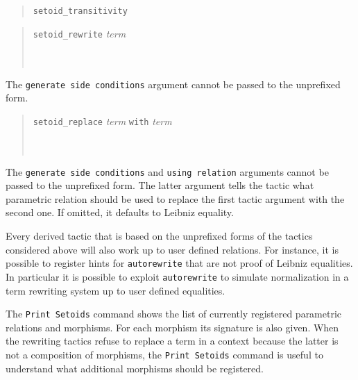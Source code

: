\begin{verse}
  \texttt{setoid\_transitivity}
\end{verse}

\begin{verse}
  \texttt{setoid\_rewrite}  \textit{term}\\
  ~\\
  ~\\
\end{verse}

The \texttt{generate side conditions} argument cannot be passed to the
unprefixed form.

\begin{verse}
  \texttt{setoid\_replace} \textit{term} \texttt{with} \textit{term}
  ~\\
  ~\\
  ~\\
\end{verse}

The \texttt{generate side conditions} and \texttt{using relation} arguments cannot be
passed to the unprefixed form. The latter argument tells the tactic what
parametric relation should be used to replace the first tactic argument
with the second one. If omitted, it defaults to Leibniz equality.

Every derived tactic that is based on the unprefixed forms of the tactics
considered above will also work up to user defined relations. For instance,
it is possible to register hints for \texttt{autorewrite} that are
not proof of Leibniz equalities. In particular it is possible to exploit
\texttt{autorewrite} to simulate normalization in a term rewriting system
up to user defined equalities.

The \texttt{Print Setoids} command shows the list of currently registered
parametric relations and morphisms. For each morphism its signature is also
given. When the rewriting tactics refuse to replace a term in a context
because the latter is not a composition of morphisms, the \texttt{Print Setoids}
command is useful to understand what additional morphisms should be registered.

